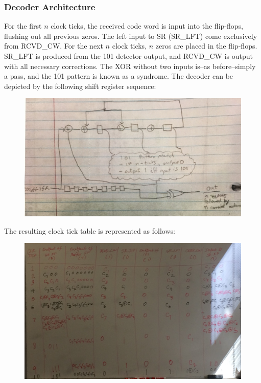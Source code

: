 \documentclass[11pt]{article}
\theoremstyle{definition}
\begin{document}
\subsubsection{Decoder Architecture}

For the first $n$ clock ticks, the received code word is input into the flip-flops, flushing out all previous zeros. The left input to SR (SR\_LFT) come exclusively from RCVD\_CW. For the next $n$ clock ticks, $n$ zeros are placed in the flip-flops. SR\_LFT is produced from the 101 detector output, and RCVD\_CW is output with all necessary corrections. The XOR without two inputs is--as before--simply a pass, and the 101 pattern is known as a syndrome. The decoder can be depicted by the following shift register sequence: 

\begin{figure}[ht]
\centering
\includegraphics[width=.87\textwidth]{decoder.JPG}
\end{figure}

\noindent The resulting clock tick table is represented as follows:

\begin{figure}[ht]
\centering
\includegraphics[width=.87\textwidth]{decoder2.JPG}
\end{figure}
\end{document}
